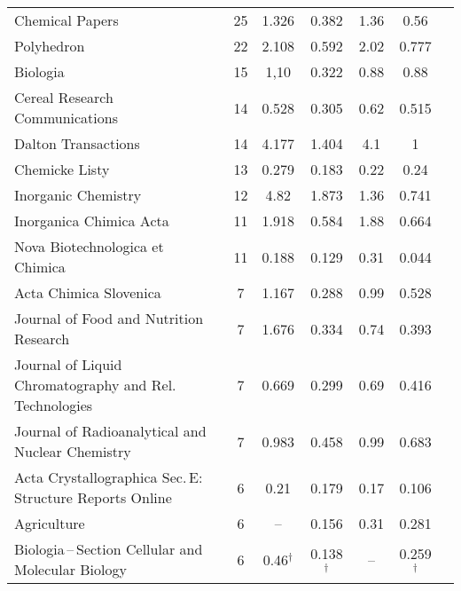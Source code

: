 {\begin{longtable}[c]{lcccccc}
  Chemical Papers                                          & 25 & 1.326         & 0.382          & 1.36 & 0.56          \\
  Polyhedron                                               & 22 & 2.108         & 0.592          & 2.02 & 0.777         \\
  Biologia                                                 & 15 & 1,10          & 0.322          & 0.88 & 0.88          \\
  Cereal Research Communications                           & 14 & 0.528         & 0.305          & 0.62 & 0.515         \\
  Dalton Transactions                                      & 14 & 4.177         & 1.404          & 4.1  & 1             \\[1ex]
  Chemicke Listy                                           & 13 & 0.279         & 0.183          & 0.22 & 0.24          \\
  Inorganic Chemistry                                      & 12 & 4.82          & 1.873          & 1.36 & 0.741         \\
  Inorganica Chimica Acta                                  & 11 & 1.918         & 0.584          & 1.88 & 0.664         \\
  Nova Biotechnologica et Chimica                          & 11 & 0.188         & 0.129          & 0.31 & 0.044         \\
  Acta Chimica Slovenica                                   & 7  & 1.167         & 0.288          & 0.99 & 0.528         \\[1ex]
  Journal of Food and Nutrition Research                   & 7  & 1.676         & 0.334          & 0.74 & 0.393         \\
  Journal of Liquid Chromatography and Rel. Technologies   & 7  & 0.669         & 0.299          & 0.69 & 0.416         \\
  Journal of Radioanalytical and Nuclear Chemistry         & 7  & 0.983         & 0.458          & 0.99 & 0.683         \\
  Acta Crystallographica Sec.\,E: Structure Reports Online & 6  & 0.21          & 0.179          & 0.17 & 0.106         \\
  Agriculture                                              & 6  & --            & 0.156          & 0.31 & 0.281         \\[1ex]
  Biologia\,--\,Section Cellular and Molecular Biology     & 6  & 0.46$^\dagger$ & 0.138 $^\dagger$ &  --  & 0.259$^\dagger$ \\

\end{longtable}}

